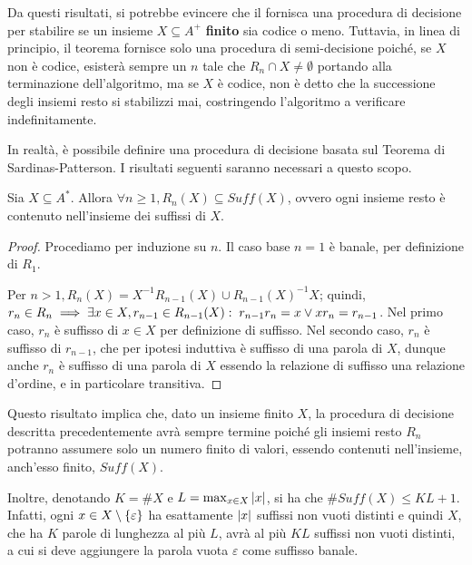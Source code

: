Da questi risultati, si potrebbe evincere che il  fornisca una procedura di decisione per stabilire se un insieme \(X \subseteq A^+\) \textbf{finito} sia codice o meno.
Tuttavia, in linea di principio, il teorema fornisce solo una procedura di semi-decisione poiché, se \(X\) non è codice, esisterà sempre un \(n\) tale che \(R_n \cap X \neq \emptyset\) portando alla terminazione dell'algoritmo, ma se \(X\) è codice, non è detto che la successione degli insiemi resto si stabilizzi mai, costringendo l'algoritmo a verificare indefinitamente.

In realtà, è possibile definire una procedura di decisione basata sul Teorema di Sardinas-Patterson.
I risultati seguenti saranno necessari a questo scopo.
\begin{proposition}[label=prop:rest_sets_subset_suffix]{}
  Sia \(X \subseteq A^*\). Allora \(\forall n \geq 1, R_n(X) \subseteq Suff(X)\), ovvero ogni insieme resto è contenuto nell'insieme dei suffissi di \(X\).
\end{proposition}
\begin{proof}
  Procediamo per induzione su \(n\).
  Il caso base \(n=1\) è banale, per definizione di \(R_1\).

  Per \(n>1, R_n(X)=X^{-1}R_{n-1}(X) \cup {R_{n-1}(X)}^{-1}X\); quindi, \(r_n \in R_n \implies \exists x \in X, r_{n-1}\in R_{n-1}(X) :\; r_{n-1}r_n = x \lor xr_n = r_{n-1}\).
  Nel primo caso, \(r_n\) è suffisso di \(x \in X\) per definizione di suffisso.
  Nel secondo caso, \(r_{n}\) è suffisso di \(r_{n-1}\), che per ipotesi induttiva è suffisso di una parola di \(X\), dunque anche \(r_n\) è suffisso di una parola di \(X\) essendo la relazione di suffisso una relazione d'ordine, e in particolare transitiva.
\end{proof}

Questo risultato implica che, dato un insieme finito \(X\), la procedura di decisione descritta precedentemente avrà sempre termine poiché gli insiemi resto \(R_n\) potranno assumere solo un numero finito di valori, essendo contenuti nell'insieme, anch'esso finito, \(Suff(X)\).

Inoltre, denotando \(K = \# X\) e \(L = \max_{x \in X} \left|x\right|\), si ha che \(\# Suff(X) \leq KL+1\).
Infatti, ogni \( x \in X \setminus \set{\varepsilon}\) ha esattamente \(\left|x\right|\) suffissi non vuoti distinti e quindi \(X\), che ha \(K\) parole di lunghezza al più \(L\), avrà al più \(KL\) suffissi non vuoti distinti, a cui si deve aggiungere la parola vuota \(\varepsilon\) come suffisso banale.

